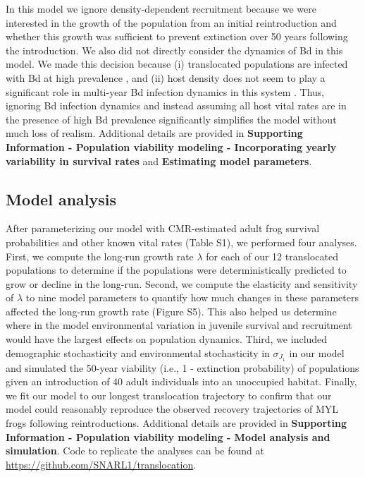 \documentclass[9pt,twocolumn,twoside,lineno]{pnas-new}
\begin{document}
{In this model we ignore density-dependent recruitment because we were
interested in the growth of the population from an initial
reintroduction and whether this growth was sufficient to prevent
extinction over 50 years following the introduction. We also did not
directly consider the dynamics of Bd in this model. We made this
decision because (i) translocated populations are infected with Bd at
high prevalence \citep{joseph2018}, and (ii) host density does not seem
to play a significant role in multi-year Bd infection dynamics in this
system \citep{wilber2022}. Thus, ignoring Bd infection dynamics and
instead assuming all host vital rates are in the presence of high Bd
prevalence significantly simplifies the model without much loss of
realism. Additional details are provided in \textbf{Supporting
Information - Population viability modeling - Incorporating yearly
variability in survival rates} and \textbf{Estimating model parameters}.

\hypertarget{model-analysis}{%
\subsection*{Model analysis}\label{model-analysis}}

After parameterizing our model with CMR-estimated adult frog survival
probabilities and other known vital rates
(Table S1), we performed four analyses. First, we
compute the long-run growth rate \(\lambda\) for each of our 12
translocated populations to determine if the populations were
deterministically predicted to grow or decline in the long-run. Second,
we compute the elasticity and sensitivity of \(\lambda\) to nine model
parameters to quantify how much changes in these parameters affected the
long-run growth rate (Figure S5). This also
helped us determine where in the model environmental variation in
juvenile survival and recruitment would have the largest effects on
population dynamics. Third, we included demographic stochasticity and
environmental stochasticity in \(\sigma_{J_1}\) in our model and
simulated the 50-year viability (i.e., 1 - extinction probability) of
populations given an introduction of 40 adult individuals into an
unoccupied habitat. Finally, we fit our model to our longest
translocation trajectory to confirm that our model could reasonably
reproduce the observed recovery trajectories of MYL frogs following
reintroductions. Additional details are provided in \textbf{Supporting
Information - Population viability modeling - Model analysis and
simulation}. Code to replicate the analyses can be found at
\url{https://github.com/SNARL1/translocation}.

}
\end{document}
